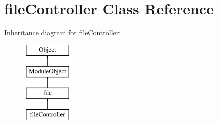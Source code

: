 \hypertarget{classfileController}{\section{file\-Controller Class Reference}
\label{classfileController}
}
Inheritance diagram for file\-Controller\-:\begin{figure}[H]
\begin{center}
\leavevmode
\includegraphics[height=4.000000cm]{classfileController}
\end{center}
\end{figure}
